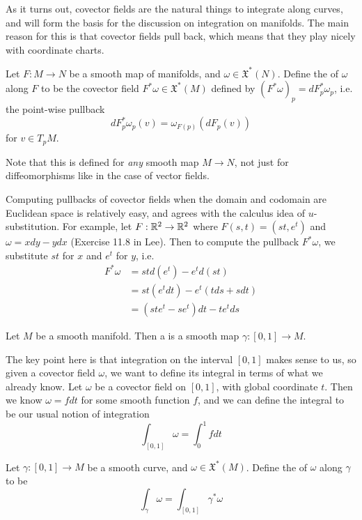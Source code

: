 As it turns out, covector fields are the natural things to integrate along
curves, and will form the basis for the discussion on integration on manifolds.
The main reason for this is that covector fields pull back, which means that
they play nicely with coordinate charts.
%
\begin{defn}
Let $F : M \to N$ be a smooth map of manifolds, and
$\omega \in \mathfrak{X}^*(N)$. Define the  of $\omega$ along $F$
to be the covector field $F^*\omega \in \mathfrak{X}^*(M)$ defined by
$(F^*\omega)_p = dF_p^*\omega_p$, i.e. the point-wise pullback
$$dF_p^*\omega_p(v) = \omega_{F(p)}(dF_p(v)) $$
for $v \in T_pM$.
\end{defn}
%
Note that this is defined for \emph{any} smooth map $M \to N$, not just for
diffeomorphisms like in the case of vector fields.
%
\begin{exmp}
Computing pullbacks of covector fields when the domain and codomain are Euclidean
space is relatively easy, and agrees with the calculus idea of $u$-substitution.
For example, let $F : \mathbb{R}^2 \to \mathbb{R}^2$ where $F(s,t) = (st, e^t)$ and
$\omega = x dy - ydx$ (Exercise 11.8 in Lee). Then to compute the pullback $F^*\omega$,
we substitute $st$ for $x$ and $e^t$ for $y$, i.e.
\begin{align*}
F^*\omega &= st d(e^t) - e^td(st) \\
&= st(e^t dt) - e^t(tds + sdt) \\
&= (ste^t - se^t)dt - te^t ds
\end{align*}
\end{exmp}
%
\begin{defn}
Let $M$ be a smooth manifold. Then a  is a smooth map
$\gamma : [0,1] \to M$.
\end{defn}
%
The key point here is that integration on the interval $[0,1]$ makes sense to
us, so given a covector field $\omega$, we want to define its integral in
terms of what we already know. Let $\omega$ be a covector field on $[0,1]$,
with global coordinate $t$. Then we know $\omega = f dt$ for some smooth
function $f$, and we can define the integral to be our usual notion of
integration
$$\int_{[0,1]} \omega = \int_0^1 fdt $$
%
\begin{defn}
Let $\gamma : [0,1] \to M$ be a smooth curve, and $\omega \in \mathfrak{X}^*(M)$.
Define the  of $\omega$ along $\gamma$ to be
$$\int_\gamma \omega = \int_{[0,1]}\gamma^*\omega $$
\end{defn}
%
